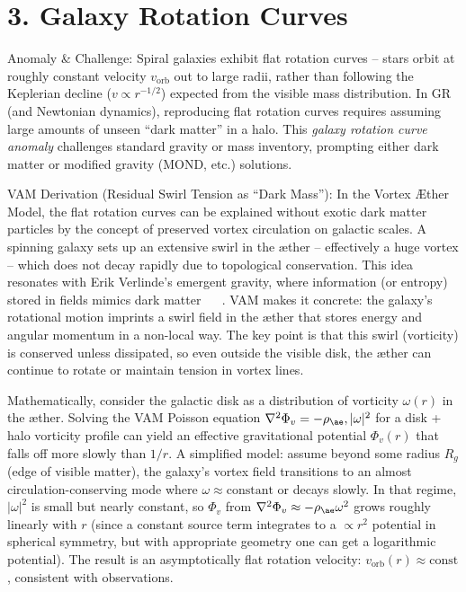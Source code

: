 \documentclass[a4paper, aps,preprint,superscriptaddress, 12pt]{revtex4}
\begin{document}
\section*{3. Galaxy Rotation Curves}

Anomaly \& Challenge: Spiral galaxies exhibit flat rotation curves – stars orbit at roughly constant velocity $v_{\text{orb}}$ out to large radii, rather than following the Keplerian decline ($v \propto r^{-1/2}$) expected from the visible mass distribution. In GR (and Newtonian dynamics), reproducing flat rotation curves requires assuming large amounts of unseen “dark matter” in a halo. This \textit{galaxy rotation curve anomaly} challenges standard gravity or mass inventory, prompting either dark matter or modified gravity (MOND, etc.) solutions.


VAM Derivation (Residual Swirl Tension as “Dark Mass”): In the Vortex Æther Model, the flat rotation curves can be explained without exotic dark matter particles by the concept of preserved vortex circulation on galactic scales. A spinning galaxy sets up an extensive swirl in the æther – effectively a huge vortex – which does not decay rapidly due to topological conservation. This idea resonates with Erik Verlinde’s emergent gravity, where information (or entropy) stored in fields mimics dark matter~\cite{Iskandarani2025c} ~\cite{Iskandarani2025c} . VAM makes it concrete: the galaxy’s rotational motion imprints a swirl field in the æther that stores energy and angular momentum in a non-local way. The key point is that this swirl (vorticity) is conserved unless dissipated, so even outside the visible disk, the æther can continue to rotate or maintain tension in vortex lines.


Mathematically, consider the galactic disk as a distribution of vorticity $\omega(r)$ in the æther. Solving the VAM Poisson equation $\nabla^2 \Phi_v = -\rho_{\ae},|\omega|^2$ for a disk + halo vorticity profile can yield an effective gravitational potential $\Phi_v(r)$ that falls off more slowly than $1/r$. A simplified model: assume beyond some radius $R_g$ (edge of visible matter), the galaxy’s vortex field transitions to an almost circulation-conserving mode where $\omega \approx \text{constant}$ or decays slowly. In that regime, $|\omega|^2$ is small but nearly constant, so $\Phi_v$ from $\nabla^2 \Phi_v \approx -\rho_{\ae}\omega^2$ grows roughly linearly with $r$ (since a constant source term integrates to a $\propto r^2$ potential in spherical symmetry, but with appropriate geometry one can get a logarithmic potential). The result is an asymptotically flat rotation velocity: $v_{\text{orb}}(r) \approx \text{const}$, consistent with observations.
\end{document}
